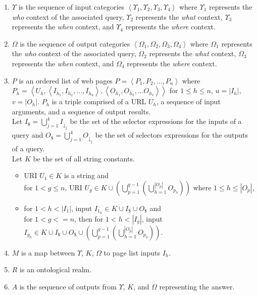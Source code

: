 \begin{enumerate}

\item $\Upsilon$ is the sequence of input categories $\left<
  \Upsilon_{1}, \Upsilon_{2}, \Upsilon_{3}, \Upsilon_{4} \right>$
  where $\Upsilon_{1}$ represents the \emph{who} context of the
  associated query, $\Upsilon_{2}$ represents the \emph{what} context,
  $\Upsilon_{3}$ represents the \emph{when} context, and
  $\Upsilon_{4}$ represents the \emph{where} context.

\item $\Omega$ is the sequence of output categories $\left<\Omega_{1},
  \Omega_{2}, \Omega_{3}, \Omega_{4}\right>$ where $\Omega_{1}$
  represents the \emph{who} context of the associated query,
  $\Omega_{2}$ represents the \emph{what} context, $\Omega_{3}$
  represents the \emph{when} context, and $\Omega_{4}$ represents the
  \emph{where} context.

\item $P$ is an ordered list of web pages $P = \left<P_1,P_2,...,
  P_n\right>$ where $P_h =
  \left<U_h,\left<I_{h_1},I_{h_2},...,I_{h_u}\right>,\left<O_{h_1},O_{h_2},...O_{h_v}\right>\right>$
  for $1 \leq h \leq n$, $u = \left| I_h \right|$, $v = \left| O_h
  \right|$. $P_h$ is a triple comprised of a URL $U_h$, a sequence of
  input arguments, and a sequence of output results.  \\ Let $I_{\$} =
  \bigcup_{j=1}^{4} I_{\downarrow_j}$ be the set of the selector
  expressions for the inputs of a query and $O_{\$} =
  \bigcup_{j=1}^{4} O_{\downarrow_j}$ be the set of selectors
  expressions for the outputs of a query.  \\ Let $K$ be the set of
  all string constants.
\begin{itemize}
\item URI $U_1 \in K$ is a string and \\ for $1 < g \leq n$, URI $U_g
  \in K \cup \left( \bigcup^{g-1}_{p=1} \left(
  \bigcup^{\left|O_p\right|}_{h=1}O_{p_h} \right)\right)$ where $1
  \leq h \leq \left| O_p \right| $,

\item for $1 < h < \left| I_1 \right|$, input $I_{1_h} \in K \cup
  I_{\$} \cup O_{\$}$ and \\ for $1 < g <= n$, then for $1 < h <
  \left| I_g \right|$, input $I_{g_h} \in K \cup I_{\$} \cup O_{\$}
  \cup \left( \bigcup^{g-1}_{p=1} \left(
  \bigcup^{\left|O_p\right|}_{h=1}O_{p_h} \right)\right)$.
\end{itemize}

\item $M$ is a map between $\Upsilon$, $K$, $\Omega$ to page list inputs $I_h$.

\item $R$ is an ontological realm. 

\item $A$ is the sequence of outputs from $\Upsilon$, $K$, and
  $\Omega$ representing the answer.

\end{enumerate}

